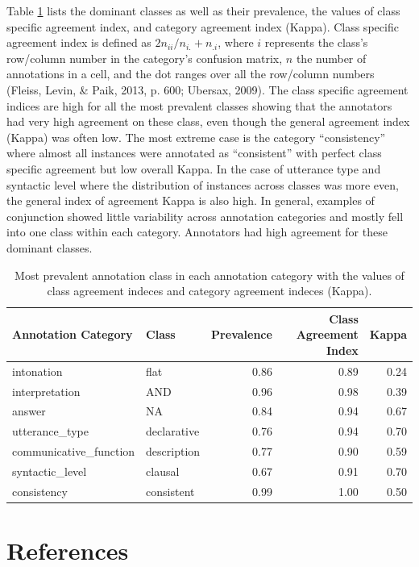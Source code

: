 \documentclass[
  ,man,floatsintext]{apa6}
\begin{document}
Table \ref{tab:andAgreeStats} lists the dominant classes as well as their prevalence, the values of class specific agreement index, and category agreement index (Kappa). Class specific agreement index is defined as \(2n_{ii}/n_{i.}+n_{.i}\), where \(i\) represents the class's row/column number in the category's confusion matrix, \(n\) the number of annotations in a cell, and the dot ranges over all the row/column numbers (Fleiss, Levin, \& Paik, 2013, p. 600; Ubersax, 2009). The class specific agreement indices are high for all the most prevalent classes showing that the annotators had very high agreement on these class, even though the general agreement index (Kappa) was often low. The most extreme case is the category ``consistency'' where almost all instances were annotated as ``consistent'' with perfect class specific agreement but low overall Kappa. In the case of utterance type and syntactic level where the distribution of instances across classes was more even, the general index of agreement Kappa is also high. In general, examples of conjunction showed little variability across annotation categories and mostly fell into one class within each category. Annotators had high agreement for these dominant classes.

\begin{table}

\caption{\label{tab:andAgreeStats}Most prevalent annotation class in each annotation category with the values of class agreement indeces and category agreement indeces (Kappa).}
\centering
\begin{tabular}[t]{l|l|r|r|r}
\hline
Annotation Category & Class & Prevalence & Class Agreement Index & Kappa\\
\hline
intonation & flat & 0.86 & 0.89 & 0.24\\
\hline
interpretation & AND & 0.96 & 0.98 & 0.39\\
\hline
answer & NA & 0.84 & 0.94 & 0.67\\
\hline
utterance\_type & declarative & 0.76 & 0.94 & 0.70\\
\hline
communicative\_function & description & 0.77 & 0.90 & 0.59\\
\hline
syntactic\_level & clausal & 0.67 & 0.91 & 0.70\\
\hline
consistency & consistent & 0.99 & 1.00 & 0.50\\
\hline
\end{tabular}
\end{table}

\hypertarget{references}{%
\section{References}\label{references}}
\end{document}
